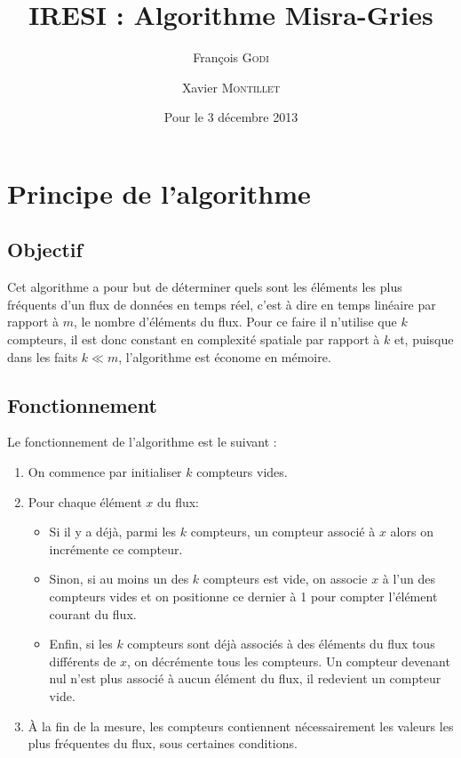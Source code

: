 \documentclass{article}
\title{IRESI : Algorithme Misra-Gries}
\author{\author{François \textsc{Godi} \and Xavier \textsc{Montillet}}}
\date{Pour le 3 décembre 2013}
\begin{document}
	
\maketitle
\tableofcontents

\section{Principe de l'algorithme}

	\subsection{Objectif}	
		Cet algorithme a pour but de déterminer quels sont les éléments les plus fréquents d'un flux de données en temps 				réel, c'est à dire en temps linéaire par rapport à $m$, le nombre d'éléments du flux. Pour ce faire il n'utilise que 			$k$ compteurs, il est donc constant en complexité spatiale par rapport à $k$ et, puisque dans les faits $k \ll m$, 				l'algorithme est économe en mémoire.
	
	\subsection{Fonctionnement}	
		Le fonctionnement de l'algorithme est le suivant : 
		\begin{enumerate}
			\item On commence par initialiser $k$ compteurs vides.
			\item Pour chaque élément $x$ du flux: 
				\begin{itemize}
					\item Si il y a déjà, parmi les $k$ compteurs, un compteur associé à $x$ alors 	on incrémente ce 									compteur.
					\item Sinon, si au moins un des $k$ compteurs est vide, on associe $x$ à l'un des compteurs vides et on 							positionne ce dernier à 1 pour compter l'élément courant du flux.
					\item  Enfin, si les $k$ compteurs sont déjà associés à des éléments du flux tous différents de $x$, on 							décrémente tous les compteurs. Un compteur devenant nul n'est plus associé à aucun élément du flux, 							il redevient un compteur vide.
				\end{itemize}
			\item À la fin de la mesure, les compteurs contiennent nécessairement les valeurs les plus fréquentes du flux, 						sous certaines conditions.
		\end{enumerate}				
	
\end{document}
